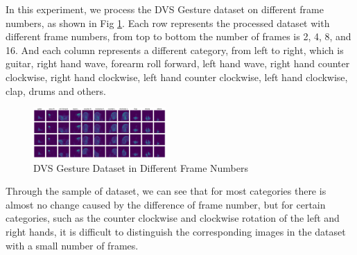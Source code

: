 \documentclass[conference]{IEEEtran}
\begin{document}
In this experiment, we process the DVS Gesture dataset on different frame numbers, as shown in Fig \ref{fig:dvs_gesture_frame_num}. Each row represents the processed dataset with different frame numbers, from top to bottom the number of frames is 2, 4, 8, and 16. And each column represents a different category, from left to right, which is guitar, right hand wave, forearm roll forward, left hand wave, right hand counter clockwise, right hand clockwise, left hand counter clockwise, left hand clockwise, clap, drums and others.
\begin{figure}[htbp]
    \centering
    \includegraphics[width=0.45\textwidth]{figure/dataset.png}
    \caption{DVS Gesture Dataset in Different Frame Numbers}
    \label{fig:dvs_gesture_frame_num}
\end{figure}

Through the sample of dataset, we can see that for most categories there is almost no change caused by the difference of frame number, but for certain categories, such as the counter clockwise and clockwise rotation of the left and right hands, it is difficult to distinguish the corresponding images in the dataset with a small number of frames.
\end{document}
